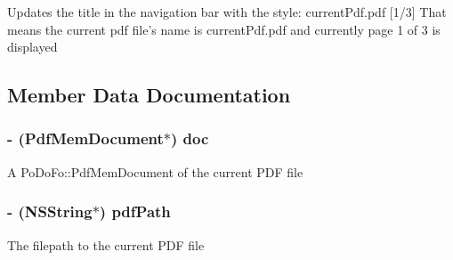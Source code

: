 Updates the title in the navigation bar with the style\-: current\-Pdf.\-pdf \mbox{[}1/3\mbox{]} That means the current pdf file's name is current\-Pdf.\-pdf and currently page 1 of 3 is displayed 

\subsection{Member Data Documentation}
\hypertarget{interface_a_p_d_f_detail_view_controller_ab8d4020661eb57276a4748ab9e39b730}{
\subsubsection[{doc}]{\setlength{\rightskip}{0pt plus 5cm}-\/ (Pdf\-Mem\-Document$\ast$) doc\hspace{0.3cm}{\ttfamily [protected]}}}\label{interface_a_p_d_f_detail_view_controller_ab8d4020661eb57276a4748ab9e39b730}
A Po\-Do\-Fo\-::\-Pdf\-Mem\-Document of the current P\-D\-F file \hypertarget{interface_a_p_d_f_detail_view_controller_adda3bad1f44d9fc5cfac4b94ab75a198}{
\subsubsection[{pdf\-Path}]{\setlength{\rightskip}{0pt plus 5cm}-\/ (N\-S\-String$\ast$) pdf\-Path\hspace{0.3cm}{\ttfamily [protected]}}}\label{interface_a_p_d_f_detail_view_controller_adda3bad1f44d9fc5cfac4b94ab75a198}
The filepath to the current P\-D\-F file 

